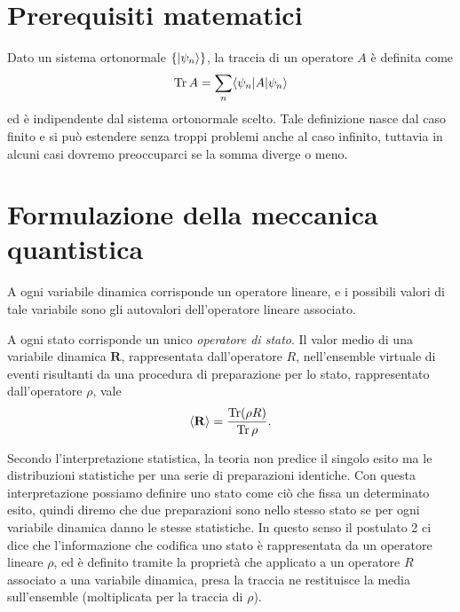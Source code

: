 \def \titolo {Meccanica Quantistica}




\frontmatter
\maketitle
\tableofcontents
\cleardoublepage
\markboth{}{}
\mainmatter

\chapter{Prerequisiti matematici}
Dato un sistema ortonormale $ \{\vert \psi_n \rangle\} $, la traccia di un operatore $ A $ è definita come 
\begin{align*}
  \operatorname{\textnormal{Tr}} A = \sum_{n} \langle \psi_n \vert A \vert \psi_n \rangle
\end{align*}
ed è indipendente dal sistema ortonormale scelto. Tale definizione nasce dal caso finito e si può estendere senza troppi problemi anche al caso infinito, 
tuttavia in alcuni casi dovremo preoccuparci se la somma diverge o meno.


\chapter{Formulazione della meccanica quantistica}

\begin{postulate}[1]
  A ogni variabile dinamica corrisponde un operatore lineare, e i possibili valori di tale variabile sono gli autovalori dell'operatore lineare associato.
\end{postulate}

\begin{postulate}[ 2 ]
  A ogni stato corrisponde un unico \textit{operatore di stato}. Il valor medio di una variabile dinamica $\mathbf{R}$, rappresentata dall'operatore $ R $, 
  nell'ensemble virtuale di eventi risultanti da una procedura di preparazione per lo stato, rappresentato dall'operatore $ \rho $, vale 
  \begin{align*}
    \left< \mathbf{R} \right> = \frac{\operatorname{\textnormal{Tr}}(\rho R)}{\operatorname{\textnormal{Tr}} \rho}.
  \end{align*}
\end{postulate}

Secondo l'interpretazione statistica, la teoria non predice il singolo esito ma le distribuzioni statistiche per una serie di preparazioni identiche. 
Con questa interpretazione possiamo definire uno stato come ciò che fissa un determinato esito, quindi diremo che due preparazioni sono nello stesso stato 
se per ogni variabile dinamica danno le stesse statistiche. In questo senso il postulato 2 ci dice che l'informazione che codifica uno stato è rappresentata 
da un operatore lineare $ \rho $, ed è definito tramite la proprietà che applicato a un operatore $ R $ associato a una variabile dinamica, presa la traccia 
ne restituisce la media sull'ensemble (moltiplicata per la traccia di $ \rho $).

